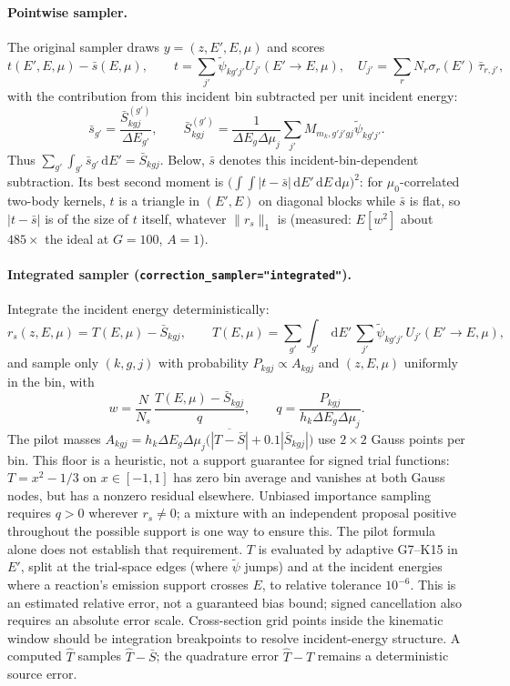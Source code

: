 \documentclass[11pt]{article}
\newcommand{\dd}{\,\mathrm{d}}
\newcommand{\tpsi}{\tilde\psi}
\newcommand{\Sbar}{\bar S}
\begin{document}
\paragraph{Pointwise sampler.} The original sampler draws $y=(z,E',E,\mu)$ and scores
\begin{equation}
  t(E',E,\mu)-\bar s(E,\mu),\qquad
  t=\sum_{j'}\tpsi_{kg'j'}U_{j'}(E'\!\to E,\mu),\quad
  U_{j'}=\sum_r N_r\sigma_r(E')\,\bar\tau_{r,j'},
\end{equation}
with the contribution from this incident bin subtracted per unit incident energy:
\[
  \bar s_{g'}=\frac{\Sbar^{(g')}_{kgj}}{\Delta E_{g'}},\qquad
  \Sbar^{(g')}_{kgj}=\frac{1}{\Delta E_g\Delta\mu_j}
  \sum_{j'}M_{m_k,g'j'gj}\tpsi_{kg'j'} .
\]
Thus $\sum_{g'}\int_{g'}\bar s_{g'}\dd E'=\Sbar_{kgj}$.
Below, $\bar s$ denotes this incident-bin-dependent subtraction. Its best second moment
is $\big(\int\!\!\int|t-\bar s|\dd E'\dd E\dd\mu\big)^2$: for $\mu_0$-correlated
two-body kernels, $t$ is a triangle in $(E',E)$ on diagonal blocks while $\bar s$ is
flat, so $|t-\bar s|$ is of the size of $t$ itself, whatever $\|r_s\|_1$ is
(measured: $E[w^2]$ about $485\times$ the ideal at $G=100$, $A=1$).

\paragraph{Integrated sampler (\texttt{correction\_sampler="integrated"}).} Integrate
the incident energy deterministically:
\begin{equation}
  r_s(z,E,\mu)=T(E,\mu)-\Sbar_{kgj},\qquad
  T(E,\mu)=\sum_{g'}\int_{g'}\!\dd E'\,\sum_{j'}\tpsi_{kg'j'}\,U_{j'}(E'\!\to E,\mu),
\end{equation}
and sample only $(k,g,j)$ with probability $P_{kgj}\propto A_{kgj}$ and $(z,E,\mu)$
uniformly in the bin, with
\begin{equation}
  w=\frac{N}{N_s}\,\frac{T(E,\mu)-\Sbar_{kgj}}{q},\qquad
  q=\frac{P_{kgj}}{h_k\Delta E_g\Delta\mu_j}.
\end{equation}
The pilot masses $A_{kgj}=h_k\Delta E_g\Delta\mu_j\big(\overline{|T-\Sbar|}+0.1|\Sbar_{kgj}|\big)$
use $2\times2$ Gauss points per bin. This floor is a heuristic, not a support
guarantee for signed trial functions: $T=x^2-1/3$ on $x\in[-1,1]$ has zero bin
average and vanishes at both Gauss nodes, but has a nonzero residual elsewhere.
Unbiased importance sampling requires $q>0$ wherever $r_s\ne0$; a mixture with an
independent proposal positive throughout the possible support is one way to ensure
this. The pilot formula alone does not establish that requirement.
$T$ is evaluated
by adaptive G7--K15 in $E'$, split at the trial-space edges (where $\tpsi$ jumps) and at
the incident energies where a reaction's emission support crosses $E$, to relative
tolerance $10^{-6}$. This is an estimated relative error, not a guaranteed bias
bound; signed cancellation also requires an absolute error scale. Cross-section
grid points inside the kinematic window should be integration breakpoints to
resolve incident-energy structure. A computed $\widehat T$ samples
$\widehat T-\Sbar$; the quadrature error $\widehat T-T$ remains a deterministic
source error.
\end{document}
